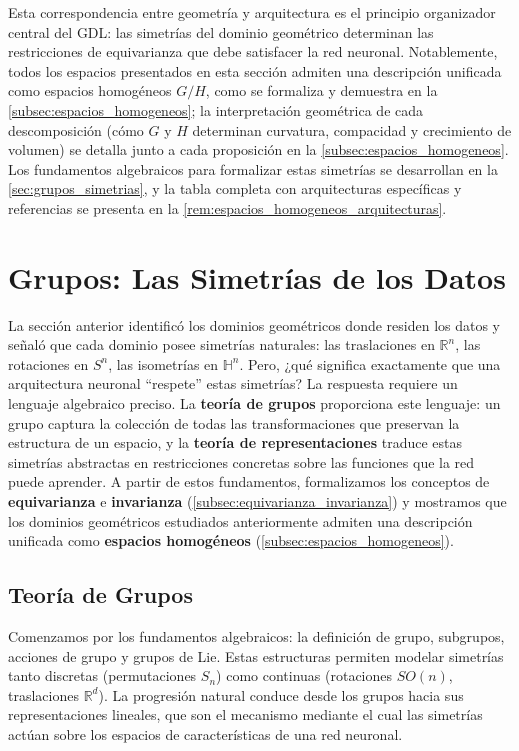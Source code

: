 Esta correspondencia entre geometría y arquitectura es el principio organizador central del \gls{GDL}: las simetrías del dominio geométrico determinan las restricciones de equivarianza que debe satisfacer la red neuronal. Notablemente, todos los espacios presentados en esta sección admiten una descripción unificada como espacios homogéneos $G/H$, como se formaliza y demuestra en la \autoref{subsec:espacios_homogeneos}; la interpretación geométrica de cada descomposición (cómo $G$ y $H$ determinan curvatura, compacidad y crecimiento de volumen) se detalla junto a cada proposición en la \autoref{subsec:espacios_homogeneos}. Los fundamentos algebraicos para formalizar estas simetrías se desarrollan en la \autoref{sec:grupos_simetrias}, y la tabla completa con arquitecturas específicas y referencias se presenta en la \autoref{rem:espacios_homogeneos_arquitecturas}.

\section{Grupos: Las Simetrías de los Datos}\label{sec:grupos_simetrias}

La sección anterior identificó los dominios geométricos donde residen los datos y señaló que cada dominio posee simetrías naturales: las traslaciones en $\mathbb{R}^n$, las rotaciones en $S^n$, las isometrías en $\mathbb{H}^n$. Pero, ¿qué significa exactamente que una arquitectura neuronal ``respete'' estas simetrías? La respuesta requiere un lenguaje algebraico preciso. La \textbf{teoría de grupos} proporciona este lenguaje: un grupo captura la colección de todas las transformaciones que preservan la estructura de un espacio, y la \textbf{teoría de representaciones} traduce estas simetrías abstractas en restricciones concretas sobre las funciones que la red puede aprender. A partir de estos fundamentos, formalizamos los conceptos de \textbf{equivarianza} e \textbf{invarianza} (\autoref{subsec:equivarianza_invarianza}) y mostramos que los dominios geométricos estudiados anteriormente admiten una descripción unificada como \textbf{espacios homogéneos} (\autoref{subsec:espacios_homogeneos}).

\subsection{Teoría de Grupos}\label{subsec:teoria_grupos_representaciones}

Comenzamos por los fundamentos algebraicos: la definición de grupo, subgrupos, acciones de grupo y grupos de Lie. Estas estructuras permiten modelar simetrías tanto discretas (permutaciones $S_n$) como continuas (rotaciones $SO(n)$, traslaciones $\mathbb{R}^d$). La progresión natural conduce desde los grupos hacia sus representaciones lineales, que son el mecanismo mediante el cual las simetrías actúan sobre los espacios de características de una red neuronal.

